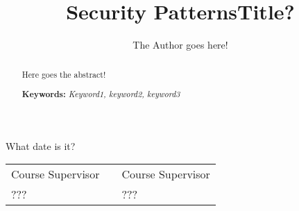 \documentclass[12pt]{llncs} %
\begin{document}
%
\frontmatter          %
%
\pagestyle{headings}  %
%

\author{The Author goes here!}
\title{Security Patterns}
\maketitle

\begin{flushright}\noindent
What date is it?
\end{flushright}
\vspace{1cm}

\begin{tabular}{p{4cm}p{4cm}p{4cm}}
Course Supervisor & & Course Supervisor \tabularnewline 
??? & & ??? \tabularnewline 
\end{tabular} 



\vspace{1cm}
\begin{abstract}
Here goes the abstract!\\
\vspace{1cm}
 
\textbf{Keywords: }
\textit{Keyword1, keyword2, keyword3}
\end{abstract}

%
\tableofcontents
%
\mainmatter              %
%
\title{Title?} 
%



\clearpage




\printindex

\pagestyle{empty}


\clearpage

%
\end{document}
